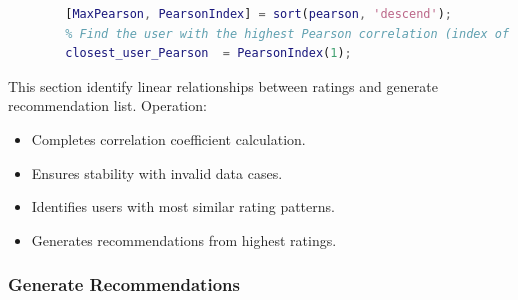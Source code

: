 \begin{enumerate}[label=\alph*.]
\begin{lstlisting}[style=StyleCode, language=MATLAB]
		% Sort the pearson vector in pearson order
		[MaxPearson, PearsonIndex] = sort(pearson, 'descend');
		% Find the user with the highest Pearson correlation (index of the first element in PearsonIndex)
		closest_user_Pearson  = PearsonIndex(1);
	\end{lstlisting}
	
	This section identify linear relationships between ratings and generate recommendation list. Operation:
	
		\begin{itemize}[label=-]
			\item Completes correlation coefficient calculation.
			\item Ensures stability with invalid data cases.
			\item Identifies users with most similar rating patterns.
			\item Generates recommendations from highest ratings.
		\end{itemize}
\end{enumerate}

\subsubsection{Generate Recommendations}

